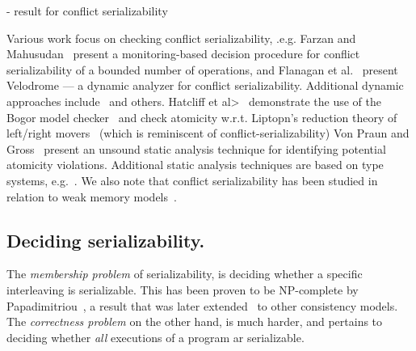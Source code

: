 - result for conflict serializability

Various work focus on checking conflict serializability, .e.g. Farzan and Mahusudan~\cite{FaMa08} present a monitoring-based decision procedure for conflict serializability of a bounded number of operations, and Flanagan et al.~\cite{FlFrYi08} present Velodrome --- a dynamic analyzer for conflict serializability. Additional dynamic approaches include~\cite{FlFr04, XuBoRa05, WaSt06a, CoOlPnTuZu07, EmMaMa10, SiMaWaGu11a} and others.
%
%
Hatcliff et al>~\cite{HaRoDw04} demonstrate the use of the Bogor model checker~\cite{RoDwHa03} and check atomicity w.r.t. Liptopn's reduction theory of left/right movers~\cite{Li75} (which is reminiscent of conflict-serializability)
%
Von Praun and Gross~\cite{VoGr04} present an unsound static analysis technique for identifying potential atomicity violations. Additional static analysis techniques are based on type systems, e.g.~\cite{FlQa03, FlFrLiQa08}.
%
We also note that conflict serializability has been studied in relation to weak memory models~\cite{EnFa16}.




\subsection{Deciding serializability.}
\label{sec:related:deciding-serializability}


The \textit{membership problem} of serializability, is deciding whether a specific interleaving is serializable. This has been proven to be NP-complete by Papadimitriou~\cite{Pa79}, a result that was later extended~\cite{BiEn19} to other consistency models.
%
The \textit{correctness problem} on the other hand, is much harder, and pertains to deciding whether \textit{all} executions of a program ar serializable.


